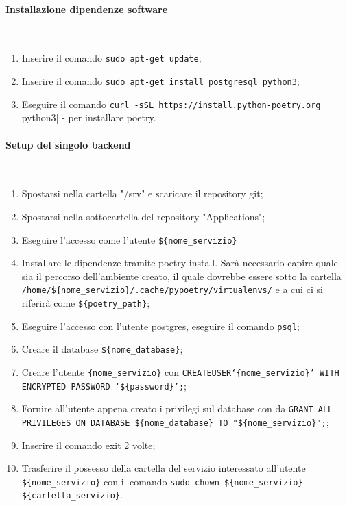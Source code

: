 \documentclass[11pt]{article} %
\begin{document}
\paragraph{Installazione dipendenze software}\mbox{}\\
\begin{enumerate}
\item Inserire il comando \verb|sudo apt-get update|;
\item Inserire il comando \verb|sudo apt-get install postgresql python3|;
\item Eseguire il comando \verb|curl -sSL https://install.python-poetry.org | python3| - per installare poetry.
\end{enumerate}

\paragraph{Setup del singolo backend}\mbox{}\\
\begin{enumerate}
\item Spostarsi nella cartella "/srv" e scaricare il repository git;
\item Spostarsi nella sottocartella del repository "Applications";
\item Eseguire l'accesso come l'utente \verb|${nome_servizio}|
\item Installare le dipendenze tramite poetry install. Sarà necessario capire quale sia il percorso dell'ambiente creato, il quale dovrebbe essere sotto la cartella \verb|/home/${nome_servizio}/.cache/pypoetry/virtualenvs/| e a cui ci si riferirà come \verb|${poetry_path}|;
\item Eseguire l'accesso con l'utente postgres, eseguire il comando \verb|psql|;
\item Creare il database \verb|${nome_database}|;
\item Creare l'utente \verb|{nome_servizio}| con \verb|CREATEUSER‘{nome_servizio}’ WITH ENCRYPTED PASSWORD ‘${password}’;|;
\item Fornire all'utente appena creato i privilegi sul database con da \verb|GRANT ALL PRIVILEGES ON DATABASE ${nome_database} TO "${nome_servizio}";|;
\item Inserire il comando exit 2 volte;
\item Trasferire il possesso della cartella del servizio interessato all'utente \verb|${nome_servizio}| con il comando \verb|sudo chown ${nome_servizio} ${cartella_servizio}|.
\end{enumerate}
\end{document}
